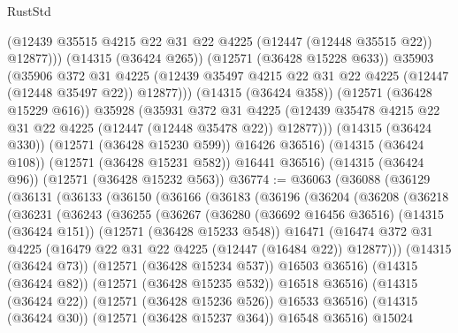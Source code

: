 \begin{lexlean}{RustStd}
\begin{coremodule}
                (@12439 @35515 @4215 @22 @31 @22 @4225 (@12447 (@12448 @35515 @22)) @12877)))
            (@14315 (@36424 @265))
            (@12571 (@36428 @15228 @633))
            @35903
            (@35906
              @372
              @31
              @4225
              (@12439 @35497 @4215 @22 @31 @22 @4225 (@12447 (@12448 @35497 @22)) @12877)))
          (@14315 (@36424 @358))
          (@12571 (@36428 @15229 @616))
          @35928
          (@35931
            @372
            @31
            @4225
            (@12439 @35478 @4215 @22 @31 @22 @4225 (@12447 (@12448 @35478 @22)) @12877)))
        (@14315 (@36424 @330))
        (@12571 (@36428 @15230 @599))
        @16426
        @36516)
      (@14315 (@36424 @108))
      (@12571 (@36428 @15231 @582))
      @16441
      @36516)
    (@14315 (@36424 @96))
    (@12571 (@36428 @15232 @563))
@36774 := @36063
    (@36088
      (@36129
        (@36131
          (@36133
            (@36150
              (@36166
                (@36183
                  (@36196
                    (@36204
                      (@36208
                        (@36218
                          (@36231
                            (@36243
                              (@36255
                                (@36267
                                  (@36280
                                    (@36692 @16456 @36516)
                                    (@14315 (@36424 @151))
                                    (@12571 (@36428 @15233 @548))
                                    @16471
                                    (@16474
                                      @372
                                      @31
                                      @4225
                                      (@16479 @22 @31 @22 @4225 (@12447 (@16484 @22)) @12877)))
                                  (@14315 (@36424 @73))
                                  (@12571 (@36428 @15234 @537))
                                  @16503
                                  @36516)
                                (@14315 (@36424 @82))
                                (@12571 (@36428 @15235 @532))
                                @16518
                                @36516)
                              (@14315 (@36424 @22))
                              (@12571 (@36428 @15236 @526))
                              @16533
                              @36516)
                            (@14315 (@36424 @30))
                            (@12571 (@36428 @15237 @364))
                            @16548
                            @36516)
                          @15024

\end{coremodule}
\end{lexlean}
